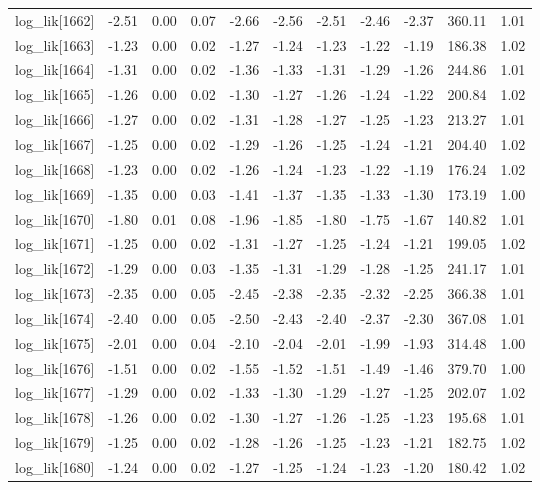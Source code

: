 \begin{table}[ht]
\begin{tabular}{rrrrrrrrrrr}
  log\_lik[1662] & -2.51 & 0.00 & 0.07 & -2.66 & -2.56 & -2.51 & -2.46 & -2.37 & 360.11 & 1.01 \\ 
  log\_lik[1663] & -1.23 & 0.00 & 0.02 & -1.27 & -1.24 & -1.23 & -1.22 & -1.19 & 186.38 & 1.02 \\ 
  log\_lik[1664] & -1.31 & 0.00 & 0.02 & -1.36 & -1.33 & -1.31 & -1.29 & -1.26 & 244.86 & 1.01 \\ 
  log\_lik[1665] & -1.26 & 0.00 & 0.02 & -1.30 & -1.27 & -1.26 & -1.24 & -1.22 & 200.84 & 1.02 \\ 
  log\_lik[1666] & -1.27 & 0.00 & 0.02 & -1.31 & -1.28 & -1.27 & -1.25 & -1.23 & 213.27 & 1.01 \\ 
  log\_lik[1667] & -1.25 & 0.00 & 0.02 & -1.29 & -1.26 & -1.25 & -1.24 & -1.21 & 204.40 & 1.02 \\ 
  log\_lik[1668] & -1.23 & 0.00 & 0.02 & -1.26 & -1.24 & -1.23 & -1.22 & -1.19 & 176.24 & 1.02 \\ 
  log\_lik[1669] & -1.35 & 0.00 & 0.03 & -1.41 & -1.37 & -1.35 & -1.33 & -1.30 & 173.19 & 1.00 \\ 
  log\_lik[1670] & -1.80 & 0.01 & 0.08 & -1.96 & -1.85 & -1.80 & -1.75 & -1.67 & 140.82 & 1.01 \\ 
  log\_lik[1671] & -1.25 & 0.00 & 0.02 & -1.31 & -1.27 & -1.25 & -1.24 & -1.21 & 199.05 & 1.02 \\ 
  log\_lik[1672] & -1.29 & 0.00 & 0.03 & -1.35 & -1.31 & -1.29 & -1.28 & -1.25 & 241.17 & 1.01 \\ 
  log\_lik[1673] & -2.35 & 0.00 & 0.05 & -2.45 & -2.38 & -2.35 & -2.32 & -2.25 & 366.38 & 1.01 \\ 
  log\_lik[1674] & -2.40 & 0.00 & 0.05 & -2.50 & -2.43 & -2.40 & -2.37 & -2.30 & 367.08 & 1.01 \\ 
  log\_lik[1675] & -2.01 & 0.00 & 0.04 & -2.10 & -2.04 & -2.01 & -1.99 & -1.93 & 314.48 & 1.00 \\ 
  log\_lik[1676] & -1.51 & 0.00 & 0.02 & -1.55 & -1.52 & -1.51 & -1.49 & -1.46 & 379.70 & 1.00 \\ 
  log\_lik[1677] & -1.29 & 0.00 & 0.02 & -1.33 & -1.30 & -1.29 & -1.27 & -1.25 & 202.07 & 1.02 \\ 
  log\_lik[1678] & -1.26 & 0.00 & 0.02 & -1.30 & -1.27 & -1.26 & -1.25 & -1.23 & 195.68 & 1.01 \\ 
  log\_lik[1679] & -1.25 & 0.00 & 0.02 & -1.28 & -1.26 & -1.25 & -1.23 & -1.21 & 182.75 & 1.02 \\ 
  log\_lik[1680] & -1.24 & 0.00 & 0.02 & -1.27 & -1.25 & -1.24 & -1.23 & -1.20 & 180.42 & 1.02 \\ 

\end{tabular}
\end{table}
